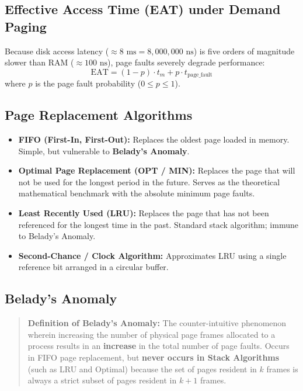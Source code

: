 \subsection{Effective Access Time (EAT) under Demand Paging}
Because disk access latency ($\approx 8\text{ ms} = 8,000,000\text{ ns}$) is five orders of magnitude slower than RAM ($\approx 100\text{ ns}$), page faults severely degrade performance:
\begin{equation}
\boxed{\text{EAT} = (1 - p) \cdot t_m + p \cdot t_{\text{page\_fault}}}
\end{equation}
where $p$ is the page fault probability ($0 \le p \le 1$).

\subsection{Page Replacement Algorithms}
\begin{itemize}
    \item \textbf{FIFO (First-In, First-Out):} Replaces the oldest page loaded in memory. Simple, but vulnerable to \textbf{Belady's Anomaly}.
    \item \textbf{Optimal Page Replacement (OPT / MIN):} Replaces the page that will not be used for the longest period in the future. Serves as the theoretical mathematical benchmark with the absolute minimum page faults.
    \item \textbf{Least Recently Used (LRU):} Replaces the page that has not been referenced for the longest time in the past. Standard stack algorithm; immune to Belady's Anomaly.
    \item \textbf{Second-Chance / Clock Algorithm:} Approximates LRU using a single reference bit arranged in a circular buffer.
\end{itemize}

\subsection{Belady's Anomaly}
\begin{quote}
\textbf{Definition of Belady's Anomaly:} The counter-intuitive phenomenon wherein increasing the number of physical page frames allocated to a process results in an \textbf{increase} in the total number of page faults. Occurs in FIFO page replacement, but \textbf{never occurs in Stack Algorithms} (such as LRU and Optimal) because the set of pages resident in $k$ frames is always a strict subset of pages resident in $k+1$ frames.
\end{quote}

